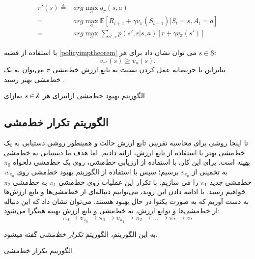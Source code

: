 \begin{align*}
	\pi'(s) \triangleq& arg\max_{a} q_\pi(s,a) \\
	= & arg\max_{a} \mathbb{E}\left[R_{t+1} + \gamma v_\pi(S_{t+1}) | S_t = s, A_t = a\right] \\
	= & arg \max_{a} \sum_{s',r} p(s',r|s,a) \left[r + \gamma v_\pi(s')\right].\end{align*}

با استفاده از قضیه \ref{policyimptheorem} می توان نشان داد برای هر
$s \in \EuScript{S}$:
$$v_{\pi'}(s) \ge v_{\pi}(s).$$
بنابراین با حریصانه عمل کردن نسبت به تابع ارزش خط‌مشی $\pi$ می‌توان به یک خط‌مشی بهتر رسید \cite{suttonbook}.


{الگوریتم بهبود خط‌مشی}
‌ازای{برای هر $s \in \EuScript{S}$}
‌به‌ازای

\subsection{الگوریتم تکرار خط‌مشی}
تا اینجا روشی برای محاسبه تقریبی تابع ارزش حالت و همینطور روشی دستیابی به یک خط‌مشی بهتر با استفاده از تابع ارزش، ارائه دادیم. اما هدف ما دستیابی به خط‌مشی بهینه است. 
برای این کار، با استفاده از ارزیابی خط‌مشی، روی یک خط‌مشی دلخواه $\pi_0$ به تخمینی از 
$v_{\pi_0}$
 برسیم؛ سپس با استفاده از الگوریتم بهبود خط‌مشی روی 
$v_{\pi_0}$،
خط‌مشی جدید 
$\pi_1$
را می سازیم. با تکرار این عملیات روی خط‌مشی 
$\pi_1$
به خط‌مشی 
$\pi_2$
خواهیم رسید. با ادامه دادن این روند، می‌توانیم دنباله‌ای از خط‌مشی‌ها و تابع ارزش‌ها به دست آوریم که به صورت یکنوا در حال بهبود هستند. می‌توان نشان داد که این دنباله از خط‌مشی‌ها و توابع ارزش، به خط‌مشی و تابع ارزش بهینه همگرا می‌شود:
$$\pi_0 \longrightarrow v_{\pi_0} \longrightarrow \pi_1 \longrightarrow v_{\pi_1} \longrightarrow \pi_2 \longrightarrow \dots \longrightarrow \pi_* \longrightarrow v_*$$

به این الگوریتم، الگوریتم \textit{تکرار خط‌مشی}  
گفته می\nf شود.

{الگوریتم تکرار خط‌مشی}

